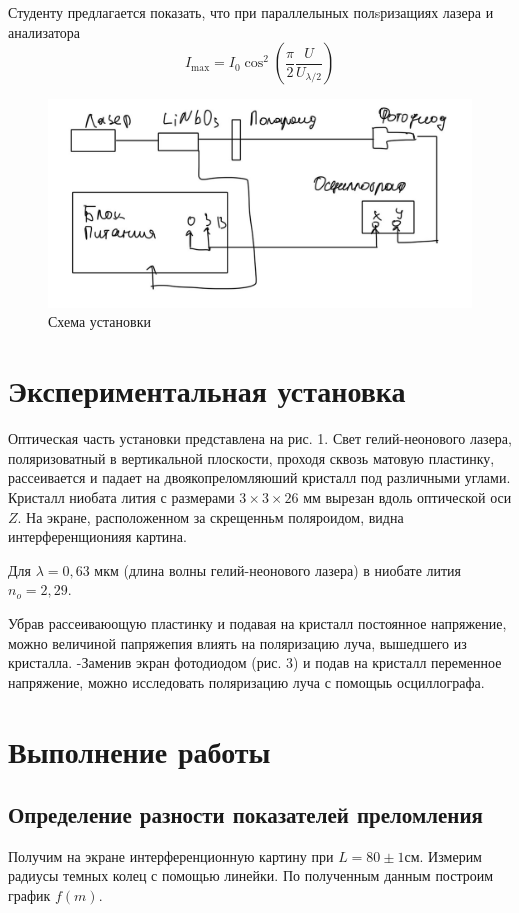 \documentclass[a4paper, 12pt]{article}
\begin{document}
Студенту предлагается показать, что при параллелыных полsризащиях лазера и анализатора
\begin{equation}
I_{\mathrm{max}}=I_0 \cos ^2\left(\frac{\pi}{2} \frac{U}{U_{\lambda / 2}}\right)
\end{equation}

\begin{figure}[H]
    \centering
    \includegraphics[width=1\textwidth]{ris3}
    \caption{Схема установки}
    \label{fig:ris3}
\end{figure}

\section{Экспериментальная установка}
Оптическая часть установки представлена на рис. 1. Свет гелий-неонового лазера, поляризоватный в вертикальной плоскости, проходя сквозь матовую пластинку, рассеивается и падает на двоякопреломляюший кристалл под различными углами. Кристалл ниобата лития с размерами $3 \times 3 \times 26$ мм вырезан вдоль оптической оси $Z$. На экране, расположенном за скрещенньм поляроидом, видна интерференщионияя картина.

Для $\lambda=0,63$ мкм (длина волны гелий-неонового лазера) в ниобате лития $n_o=2,29$.

Убрав рассеиваюощую пластинку и подавая на кристалл постоянное напряжение, можно величиной папряжепия влиять на поляризацию луча, вышедшего из кристалла.
-Заменив экран фотодиодом (рис. 3) и подав на кристалл переменное напряжение, можно исследовать поляризацию луча с помощыь осциллографа.
\section{Выполнение работы}
\subsection*{Определение разности показателей преломления}
Получим на экране интерференционную картину при $L = 80 \pm 1 см$. Измерим радиусы темных колец с помощью линейки. По полученным данным построим график $f(m)$.
\end{document}
